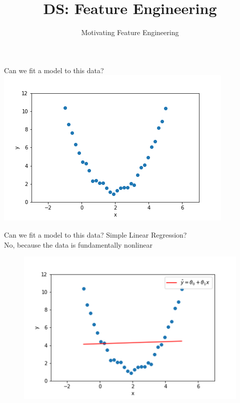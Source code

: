 \documentclass[aspectratio=169]{../latex_main/tntbeamer}  %
\title[Introduction]{DS: Feature Engineering}
\subtitle{Motivating Feature Engineering}
\begin{document}
	
	\maketitle
	\begin{frame}{Can we fit a model to this data?}
	    \centering
	    \includegraphics[scale=.75]{Bild1}
	\end{frame}
	
	
	\begin{frame}{Can we fit a model to this data?}
	    Simple Linear Regression?\\
	    No, because the data is fundamentally nonlinear
	    \begin{figure}
	        \centering
	        \includegraphics[scale=.65]{Bild2}
	    \end{figure}
	\end{frame}
	
\end{document}
